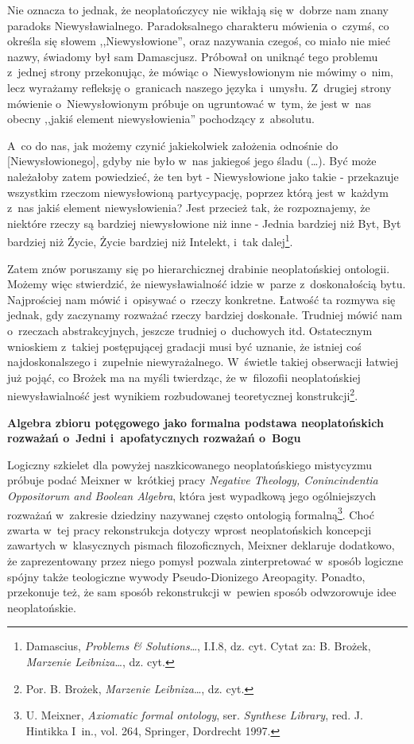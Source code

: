 Nie oznacza to jednak, że neoplatończycy nie wikłają się w~dobrze nam znany paradoks Niewysławialnego. Paradoksalnego charakteru mówienia o~czymś, co określa się słowem ,,Niewysłowione'', oraz nazywania czegoś, co miało nie mieć nazwy, świadomy był sam Damascjusz. Próbował on uniknąć tego problemu z~jednej strony przekonując, że mówiąc o~Niewysłowionym nie mówimy o~nim, lecz wyrażamy refleksję o~granicach naszego języka i~umysłu. Z~drugiej strony mówienie o~Niewysłowionym próbuje on ugruntować w~tym, że jest w~nas obecny ,,jakiś element niewysłowienia'' pochodzący z~absolutu.

A~co do nas, jak możemy czynić jakiekolwiek założenia odnośnie do [Niewysłowionego], gdyby nie było w~nas jakiegoś jego śladu (…). Być może należałoby zatem powiedzieć, że ten byt - Niewysłowione jako takie - przekazuje wszystkim rzeczom niewysłowioną partycypację, poprzez którą jest w~każdym z~nas jakiś element niewysłowienia? Jest przecież tak, że rozpoznajemy, że niektóre rzeczy są bardziej niewysłowione niż inne - Jednia bardziej niż Byt, Byt bardziej niż Życie, Życie bardziej niż Intelekt, i~tak dalej\footnote{ Damascius, \textit{Problems \& Solutions}…, I.I.8, dz. cyt. Cytat za: B. Brożek, \textit{Marzenie Leibniza}…, dz. cyt.}.

Zatem znów poruszamy się po hierarchicznej drabinie neoplatońskiej ontologii. Możemy więc stwierdzić, że niewysławialność idzie w~parze z~doskonałością bytu. Najprościej nam mówić i~opisywać o~rzeczy konkretne. Łatwość ta rozmywa się jednak, gdy zaczynamy rozważać rzeczy bardziej doskonałe. Trudniej mówić nam o~rzeczach abstrakcyjnych, jeszcze trudniej o~duchowych itd. Ostatecznym wnioskiem z~takiej postępującej gradacji musi być uznanie, że istniej coś najdoskonalszego i~zupełnie niewyrażalnego. W~świetle takiej obserwacji łatwiej już pojąć, co Brożek ma na myśli twierdząc, że w~filozofii neoplatońskiej niewysławialność jest wynikiem rozbudowanej teoretycznej konstrukcji\footnote{ Por. B. Brożek, \textit{Marzenie Leibniza}…, dz. cyt.}.

\textbf{Algebra zbioru potęgowego jako formalna podstawa neoplatońskich rozważań o~Jedni i~apofatycznych rozważań o~Bogu}

Logiczny szkielet dla powyżej naszkicowanego neoplatońskiego mistycyzmu próbuje podać Meixner w~krótkiej pracy \textit{Negative Theology, Conincindentia Oppositorum and Boolean Algebra}, która jest wypadkową jego ogólniejszych rozważań w~zakresie dziedziny nazywanej często ontologią formalną\footnote{ U. Meixner, \textit{Axiomatic formal ontology}, ser. \textit{Synthese Library}, red. J. Hintikka I~in., vol. 264, Springer, Dordrecht 1997.}. Choć zwarta w~tej pracy rekonstrukcja dotyczy wprost neoplatońskich koncepcji zawartych w~klasycznych pismach filozoficznych, Meixner deklaruje dodatkowo, że zaprezentowany przez niego pomysł pozwala zinterpretować w~sposób logiczne spójny także teologiczne wywody Pseudo-Dionizego Areopagity. Ponadto, przekonuje też, że sam sposób rekonstrukcji w~pewien sposób odwzorowuje idee neoplatońskie.


